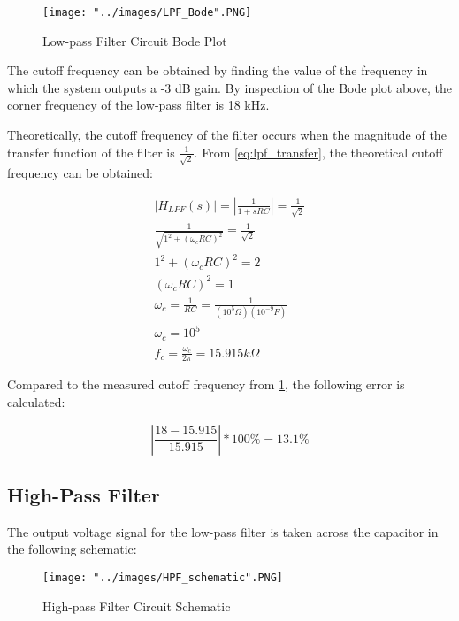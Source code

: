 \FloatBarrier

\begin{figure}[h!]
	\centering
	\texttt{[image: "../images/LPF\_Bode".PNG]}
	\caption{Low-pass Filter Circuit Bode Plot}
	\label{fig:LPF_Bode}
\end{figure}

\FloatBarrier

The cutoff frequency can be obtained by finding the value of the frequency in which the system outputs a -3 dB gain. By inspection of the Bode plot above, the corner frequency of the low-pass filter is 18 kHz.

Theoretically, the cutoff frequency of the filter occurs when the magnitude of the transfer function of the filter is $\frac{1}{\sqrt{2}}$. From \ref{eq:lpf_transfer}, the theoretical cutoff frequency can be obtained:

\begin{equation}
\label{eq:lpf_cutoff}
\begin{gathered}
|H_{LPF}(s)| = |\frac{1}{1+sRC}| = \frac{1}{\sqrt{2}}\\
\frac{1}{\sqrt{1^2 + (\omega_{c} RC)^2}} = \frac{1}{\sqrt{2}}\\
1^2 + (\omega_{c} RC)^2 = 2\\
(\omega_{c} RC)^2 = 1\\
\omega_{c} = \frac{1}{RC} = \frac{1}{(10^5 \Omega)(10^{-9} F)}\\
\omega_{c} = 10^5\\
f_{c}  = \frac{\omega_{c}}{2\pi} = 15.915 k\Omega
\end{gathered}
\end{equation}

Compared to the measured cutoff frequency from \ref{fig:LPF_Bode}, the following error is calculated:

\begin{equation}
\label{eq:lpf_cutoff_error}
|\frac{18 - 15.915}{15.915}| * 100\% = 13.1\%
\end{equation}


\subsection{High-Pass Filter}

The output voltage signal for the low-pass filter is taken across the capacitor in the following schematic:

\begin{figure}[h!]
	\centering
	\texttt{[image: "../images/HPF\_schematic".PNG]}
	\caption{High-pass Filter Circuit Schematic}
	\label{fig:HPF_Schematic}
\end{figure}

